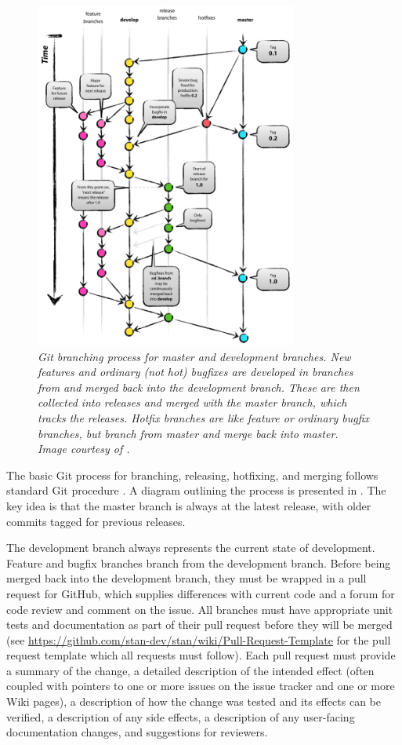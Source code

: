 \begin{figure}
\begin{center}
\includegraphics[height=4.5in]{img/git-process.png}
\end{center}
\caption{\small\it Git branching process for master
  and development branches.  New features and ordinary (not hot) 
  bugfixes are developed in branches from and merged back into the
  development  branch.  These are then
  collected into releases and merged with the master branch, which
  tracks the releases.  Hotfix branches are like feature or ordinary
  bugfix branches, but branch from master and merge back into master. 
  Image courtesy of \citep{Driessen:2010}.}\label{git-process.figure} \end{figure}
%
The basic Git process for branching, releasing, hotfixing, and merging
follows standard Git procedure \citep{Driessen:2010}. A diagram
outlining the process is presented in . The key
idea is that the master branch is always at the latest release, with
older commits tagged for previous releases. 

The development branch always represents the current state of
development. Feature and bugfix branches branch from the development
branch. Before being merged back into the development branch, they
must be wrapped in a pull request for GitHub, which supplies
differences with current code and a forum for code review and comment
on the issue. All branches must have appropriate unit tests and
documentation as part of their pull request before they will be merged
(see \url{https://github.com/stan-dev/stan/wiki/Pull-Request-Template}
for the pull request template which all requests must follow).  Each
pull request must provide a summary of the change, a detailed
description of the intended effect (often coupled with pointers to one
or more issues on the issue tracker and one or more Wiki pages), a
description of how the change was tested and its effects can be
verified, a description of any side effects, a description of any
user-facing documentation changes, and suggestions for reviewers.


